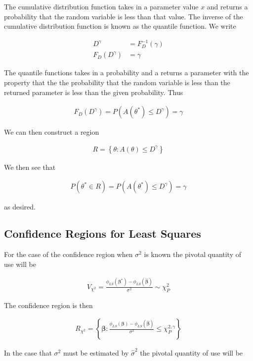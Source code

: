 \documentclass[12pt]{article}
\newcommand{\bv}[1]{\boldsymbol{#1}}
\begin{document}
The cumulative distribution function takes in a parameter value $x$ and returns a probability that the random variable is less than that value.
The inverse of the cumulative distribution function is known as the quantile function.
We write

\begin{align}
D^{\gamma} &= F^{-1}_D(\gamma)\\
F_D(D^{\gamma}) &= \gamma
\end{align}

The quantile functions takes in a probability and a returns a parameter with the property that the the probability that the random variable is less than the returned parameter is less than the given probability.
Thus

\begin{align}
F_D(D^{\gamma}) = P(A(\theta^*) \le D^{\gamma}) = \gamma
\end{align}

We can then construct a region

\begin{align}
R = \left\{\theta: A(\theta) \le D^{\gamma} \right\}
\end{align}

We then see that

\begin{align}
P(\theta^* \in R) = P(A(\theta^*) \le D^{\gamma}) = \gamma
\end{align}

as desired.

\subsection{Confidence Regions for Least Squares}
For the case of the confidence region when $\sigma^2$ is known the pivotal quantity of use will be

\begin{align}
V_{\chi^2} = \frac{\phi_{LS}(\bv{\beta^*}) - \phi_{LS}(\bv{\hat{\beta}})}{\sigma^2} \sim \chi^2_P
\end{align}

The confidence region is then

\begin{align}
 R_{\chi^2} = \left\{\bv{\beta}: \frac{\phi_{LS}(\bv{\beta}) - \phi_{LS}(\bv{\hat{\beta}})}{\sigma^2} \le \chi^{2,\gamma}_P\right\}
\end{align}

In the case that $\sigma^2$ must be estimated by $\hat{\sigma}^2$ the pivotal quantity of use will be
\end{document}
